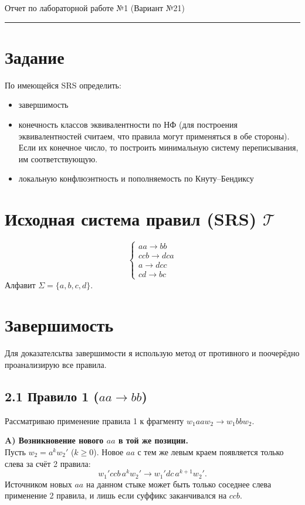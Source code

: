 \documentclass[12pt,a4paper]{article}
\begin{document}
{\Large\bfseries
\begin{flushleft}
Отчет по лабораторной работе №1 (Вариант №21)
\end{flushleft}}
\vspace{0.5em}\hrule\vspace{1.2em}

\section*{Задание}
По имеющейся SRS определить:
\begin{itemize}[leftmargin=1.5em]
  \item завершимость
  \item конечность классов эквивалентности по НФ (для построения эквивалентностей считаем, что правила могут применяться в обе стороны). Если их конечное число, то построить минимальную систему переписывания, им соответствующую.
  \item локальную конфлюэнтность и пополняемость по Кнуту--Бендиксу
\end{itemize}

\section*{Исходная система правил (SRS) \(\mathcal{T}\)}
\[
\begin{cases}
aa \to bb\\
ccb \to dca\\
a \to dcc\\
cd \to bc
\end{cases}
\]
Алфавит $\Sigma=\{a,b,c,d\}$.

\section*{Завершимость}
Для доказателсьтва завершимости я использую метод от противного и поочерёдно проанализирую все правила.

\subsection*{2.1 Правило 1 (\(aa \to bb\))}
Рассматриваю применение правила 1 к фрагменту \(w_1aa w_2 \to w_1bb w_2\).

\textbf{A) Возникновение нового \(aa\) в той же позиции.}\\
Пусть \(w_2=a^{k}w_2'\) (\(k\ge0\)). Новое \(aa\) с тем же левым краем появляется только слева за счёт 2 правила:
\[
w_1'ccb\,a^{k}w_2' \to w_1'dc\,a^{k+1}w_2'.
\]
Источником новых \(aa\) на данном стыке может быть только соседнее слева применение 2 правила, и лишь если суффикс заканчивался на \(ccb\).
\end{document}
